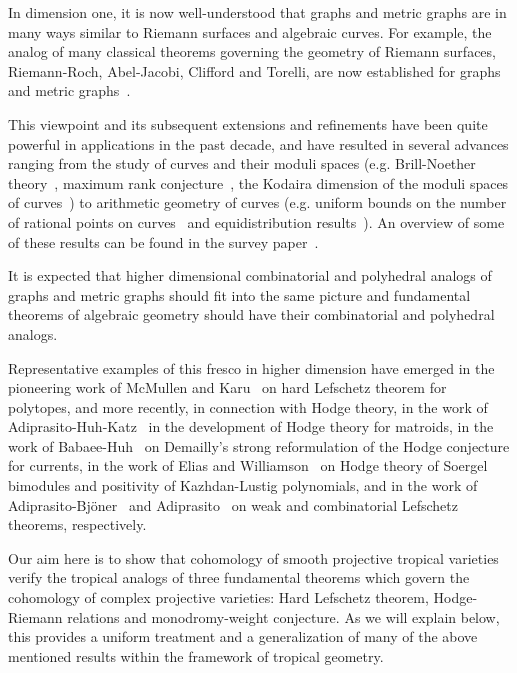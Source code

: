\documentclass[11pt]{amsart}
\theoremstyle{definition}
\numberwithin{equation}{section}
\renewcommand{\~}{\widetilde}
\begin{document}
\medskip

In dimension one, it is now well-understood that graphs and metric graphs are in many ways similar to Riemann surfaces and algebraic curves. For example, the analog of many classical theorems governing the geometry of Riemann surfaces, Riemann-Roch, Abel-Jacobi, Clifford and Torelli, are now established for graphs and metric graphs~\cites{BN07, GK08, MZ08, Coppens, CV10, AB15}.

This viewpoint and its subsequent extensions and refinements have been quite powerful in applications in the past decade, and have resulted in several advances ranging from the study of curves and their moduli spaces (e.g. Brill-Noether theory~\cite{CDPR}, maximum rank conjecture~\cite{JP}, the Kodaira dimension of the moduli spaces of curves~\cite{FJP}) to arithmetic geometry of curves (e.g. uniform bounds on the number of rational points on curves~\cite{KRZ} and equidistribution results~\cite{Ami14}). An overview of some of these results can be found in the survey paper~\cite{BJ16}.

\medskip

It is expected that higher dimensional combinatorial and polyhedral analogs of graphs and metric graphs should fit into the same picture and fundamental theorems of algebraic geometry should have their combinatorial and polyhedral analogs.

\medskip

Representative examples of this fresco in higher dimension have emerged in the pioneering work of McMullen and Karu~\cites{Mcmullen, Karu} on hard Lefschetz theorem for polytopes, and more recently, in connection with Hodge theory, in the work of Adiprasito-Huh-Katz~\cite{AHK} in the development of Hodge theory for matroids, in the work of Babaee-Huh~\cite{BH17} on Demailly's strong reformulation of the Hodge conjecture for currents, in the work of Elias and Williamson~\cite{EW} on Hodge theory of Soergel bimodules and positivity of Kazhdan-Lustig polynomials, and in the work of Adiprasito-Bj\"oner~\cite{AB} and Adiprasito~\cite{Adi18} on weak and combinatorial Lefschetz theorems, respectively.

\medskip

Our aim here is to show that cohomology of smooth projective tropical varieties verify the tropical analogs of three fundamental theorems which govern the cohomology of complex projective varieties: Hard Lefschetz theorem, Hodge-Riemann relations and monodromy-weight conjecture. As we will explain below, this provides a uniform treatment and a generalization of many of the above mentioned results within the framework of tropical geometry.
\end{document}
